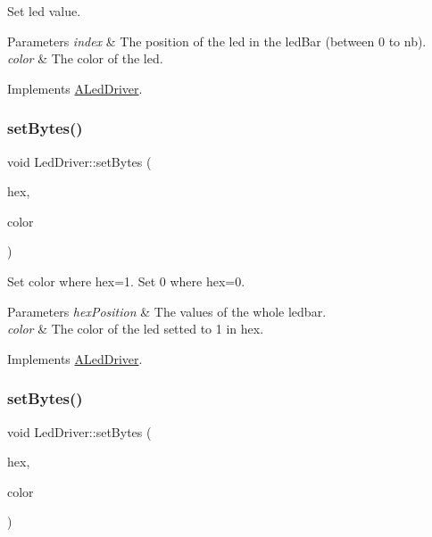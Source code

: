 Set led value. 


\begin{DoxyParams}{Parameters}
{\em index} & The position of the led in the led\+Bar (between 0 to nb). \\
\hline
{\em color} & The color of the led. \\
\hline
\end{DoxyParams}


Implements \hyperlink{classALedDriver_acbc8507c36f0f4fa3afb845d81e56eb2}{A\+Led\+Driver}.

\mbox{\label{classLedDriver_a66512dd673a81681d3597e301af13759}} 
\subsubsection{\texorpdfstring{set\+Bytes()}{setBytes()}\hspace{0.1cm}{\footnotesize\ttfamily [1/6]}}
{\footnotesize\ttfamily void Led\+Driver\+::set\+Bytes (\begin{DoxyParamCaption}\item[{uint}]{hex,  }\item[{Led\+Color}]{color }\end{DoxyParamCaption})\hspace{0.3cm}{\ttfamily [virtual]}}



Set color where hex=1. Set 0 where hex=0. 


\begin{DoxyParams}{Parameters}
{\em hex\+Position} & The values of the whole ledbar. \\
\hline
{\em color} & The color of the led setted to 1 in hex. \\
\hline
\end{DoxyParams}


Implements \hyperlink{classALedDriver_a3a219f7546870d4bce0ae36cad3b0518}{A\+Led\+Driver}.

\mbox{\label{classLedDriver_a66512dd673a81681d3597e301af13759}} 
\subsubsection{\texorpdfstring{set\+Bytes()}{setBytes()}\hspace{0.1cm}{\footnotesize\ttfamily [2/6]}}
{\footnotesize\ttfamily void Led\+Driver\+::set\+Bytes (\begin{DoxyParamCaption}\item[{uint}]{hex,  }\item[{Led\+Color}]{color }\end{DoxyParamCaption})\hspace{0.3cm}{\ttfamily [virtual]}}



